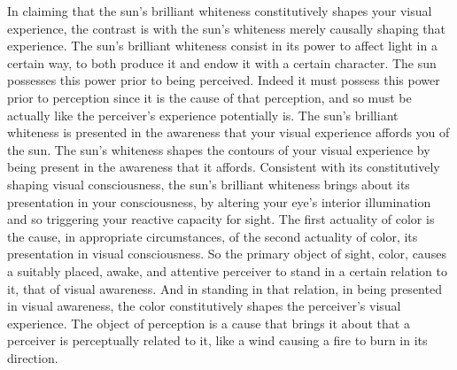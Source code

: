 In claiming that the sun's brilliant whiteness constitutively shapes your visual experience, the contrast is with the sun's whiteness merely causally shaping that experience. The sun's brilliant whiteness consist in its power to affect light in a certain way, to both produce it and endow it with a certain character. The sun possesses this power prior to being perceived. Indeed it must possess this power prior to perception since it is the cause of that perception, and so must be actually like the perceiver's experience potentially is. The sun's brilliant whiteness is presented in the awareness that your visual experience affords you of the sun. The sun's whiteness shapes the contours of your visual experience by being present in the awareness that it affords. Consistent with its constitutively shaping visual consciousness, the sun's brilliant whiteness brings about its presentation in your consciousness, by altering your eye's interior illumination and so triggering your reactive capacity for sight. The first actuality of color is the cause, in appropriate circumstances, of the second actuality of color, its presentation in visual consciousness. So the primary object of sight, color, causes a suitably placed, awake, and attentive perceiver to stand in a certain relation to it, that of visual awareness. And in standing in that relation, in being presented in visual awareness, the color constitutively shapes the perceiver's visual experience. The object of perception is a cause that brings it about that a perceiver is perceptually related to it, like a wind causing a fire to burn in its direction.


